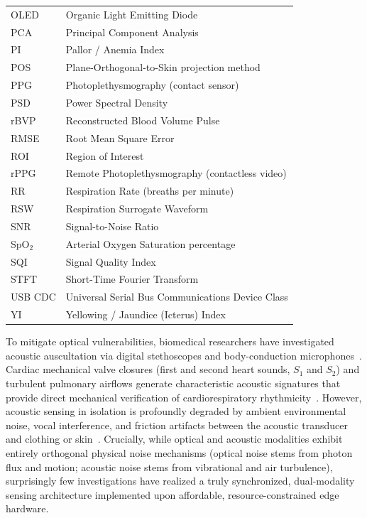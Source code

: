 \documentclass[journal]{IEEEtran}
\begin{document}
\begin{table}[!t]
\begin{tabular}{ll}
        OLED & Organic Light Emitting Diode \\
        PCA & Principal Component Analysis \\
        PI & Pallor / Anemia Index \\
        POS & Plane-Orthogonal-to-Skin projection method \\
        PPG & Photoplethysmography (contact sensor) \\
        PSD & Power Spectral Density \\
        rBVP & Reconstructed Blood Volume Pulse \\
        RMSE & Root Mean Square Error \\
        ROI & Region of Interest \\
        rPPG & Remote Photoplethysmography (contactless video) \\
        RR & Respiration Rate (breaths per minute) \\
        RSW & Respiration Surrogate Waveform \\
        SNR & Signal-to-Noise Ratio \\
        SpO$_2$ & Arterial Oxygen Saturation percentage \\
        SQI & Signal Quality Index \\
        STFT & Short-Time Fourier Transform \\
        USB CDC & Universal Serial Bus Communications Device Class \\
        YI & Yellowing / Jaundice (Icterus) Index \\
        \bottomrule
    \end{tabular}
\end{table}

To mitigate optical vulnerabilities, biomedical researchers have investigated acoustic auscultation via digital stethoscopes and body-conduction microphones~\cite{ref10}. Cardiac mechanical valve closures (first and second heart sounds, $S_1$ and $S_2$) and turbulent pulmonary airflows generate characteristic acoustic signatures that provide direct mechanical verification of cardiorespiratory rhythmicity~\cite{ref11}. However, acoustic sensing in isolation is profoundly degraded by ambient environmental noise, vocal interference, and friction artifacts between the acoustic transducer and clothing or skin~\cite{ref12}. Crucially, while optical and acoustic modalities exhibit entirely orthogonal physical noise mechanisms (optical noise stems from photon flux and motion; acoustic noise stems from vibrational and air turbulence), surprisingly few investigations have realized a truly synchronized, dual-modality sensing architecture implemented upon affordable, resource-constrained edge hardware.
\end{document}
